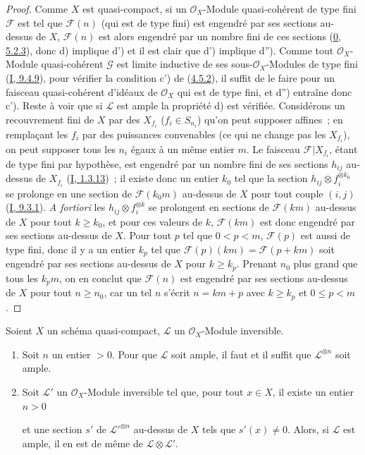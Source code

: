 \begin{proof}
Comme $X$ est quasi-compact, si un $\mathcal{O}_X$-Module quasi-cohérent de
type fini $\mathcal{F}$ est tel que $\mathcal{F}(n)$ (qui est de type fini)
est engendré par ses sections au-dessus de $X$, $\mathcal{F}(n)$ est alors
engendré par un nombre fini de ces sections
(\hyperref[0.5.2.3-fr]{0, 5.2.3}), donc d) implique d') et il est clair que
d') implique d''). Comme tout $\mathcal{O}_X$-Module quasi-cohérent
$\mathcal{G}$ est limite inductive de ses sous-$\mathcal{O}_X$-Modules de
type fini (\hyperref[I.9.4.9-fr]{I, 9.4.9}), pour vérifier la condition c')
de (\hyperref[II.4.5.2-fr]{4.5.2}), il suffit de le faire pour un faisceau
quasi-cohérent d'idéaux de $\mathcal{O}_X$ qui est de type fini, et d'')
entraîne donc c'). Reste à voir que si $\mathcal{L}$ est ample la propriété
d) est vérifiée. Considérons un recouvrement fini de $X$ par des
$X_{f_i}$ ($f_i\in S_{n_i}$) qu'on peut supposer affines~; en remplaçant les
$f_i$ par des puissances convenables (ce qui ne change pas les $X_{f_i}$),
on peut supposer tous les $n_i$ égaux à un même entier $m$. Le faisceau
$\mathcal{F}|X_{f_i}$, étant de type fini par hypothèse, est engendré par un
nombre fini de ses sections $h_{ij}$ au-dessus de $X_{f_i}$
(\hyperref[I.1.3.13-fr]{I, 1.3.13})~; il existe donc un entier $k_0$ tel que
la section $h_{ij}\otimes f_i^{\otimes k_0}$ se prolonge en une section de
$\mathcal{F}(k_0m)$ au-dessus de $X$ pour tout couple $(i,j)$
(\hyperref[I.9.3.1-fr]{I, 9.3.1}). \emph{A fortiori} les
$h_{ij}\otimes f_i^{\otimes k}$ se prolongent en sections de
$\mathcal{F}(km)$ au-dessus de $X$ pour tout $k\geq k_0$, et pour ces valeurs
de $k$, $\mathcal{F}(km)$ est donc engendré par ses sections au-dessus de
$X$. Pour tout $p$ tel que $0<p<m$, $\mathcal{F}(p)$ est aussi de type fini,
donc il y a un entier $k_p$ tel que
$\mathcal{F}(p)(km)=\mathcal{F}(p+km)$ soit engendré par ses sections
au-dessus de $X$ pour $k\geq k_p$. Prenant $n_0$ plus grand que tous les
$k_pm$, on en conclut que $\mathcal{F}(n)$ est engendré par ses sections
au-dessus de $X$ pour tout $n\geq n_0$, car un tel $n$ s'écrit $n=km+p$ avec
$k\geq k_p$ et $0\leq p<m$.
\end{proof}

\begin{proposition}[4.5.6]
\label{II.4.5.6-fr}
Soient $X$ un schéma quasi-compact, $\mathcal{L}$ un $\mathcal{O}_X$-Module
inversible.
\begin{enumerate}
  \item[\rm{(i)}] Soit $n$ un entier $>0$. Pour que $\mathcal{L}$ soit
  ample, il faut et il suffit que $\mathcal{L}^{\otimes n}$ soit ample.
  \item[\rm{(ii)}] Soit $\mathcal{L}'$ un $\mathcal{O}_X$-Module inversible
  tel que, pour tout $x\in X$, il existe un entier $n>0$


  et une section $s'$ de $\mathcal{L}'^{\otimes n}$ au-dessus de $X$ tels
  que $s'(x)\neq0$. Alors, si $\mathcal{L}$ est ample, il en est de même de
  $\mathcal{L}\otimes\mathcal{L}'$.
\end{enumerate}
\end{proposition}

